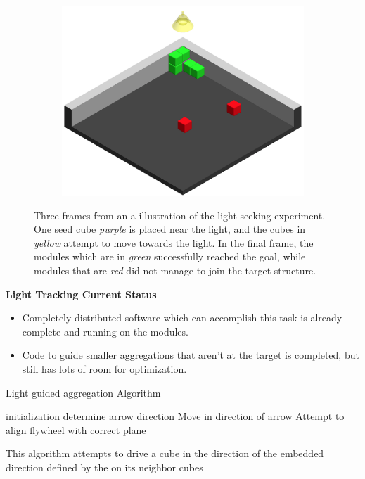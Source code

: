 \begin{figure}[h]
\begin{subfigure}[b]{0.3\linewidth}
		\includegraphics[width=0.9\linewidth]{figures/light_3.png}
		\subcaption{} 
	\end{subfigure}
	
	\caption{Three frames from an a illustration of the light-seeking experiment. One seed cube \emph{purple} is placed near the light, and the cubes in \emph{yellow} attempt to move towards the light. In the final frame, the modules which are in \emph{green} successfully reached the goal, while modules that are \emph{red} did not manage to join the target structure.}
	
	\label{fig:light}
\end{figure}

\textbf{Light Tracking Current Status}
\begin{itemize}
	\item Completely distributed software which can accomplish this task is already complete and running on the modules.
	\item Code to guide smaller aggregations that aren't at the target is completed, but still has lots of room for optimization.
\end{itemize}


\begin{algorithm}[htbp] 
	\caption{Light guided aggregation Algorithm}
	\label{algorithmAggregate}
	\SetAlgoLined
	initialization\;
	{
		determine arrow direction\;
		{
			Move in direction of arrow\;
		}
		{
			Attempt to align flywheel with correct plane\;
		}
	}
	\caption{This algorithm attempts to drive a cube in the direction of the embedded direction defined by the \tagName on its neighbor cubes}
	
\end{algorithm}